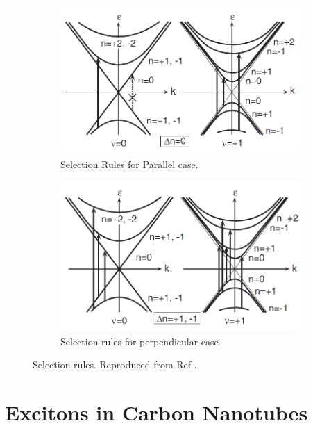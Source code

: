\begin{figure}[H]
	\centering
	\begin{subfigure}{\textwidth}
		\centering
		\includegraphics[scale=0.7]{images/chapter_optical_props/selection_rules_1.png}
		\caption{Selection Rules for Parallel case.}
	\end{subfigure}
	\begin{subfigure}{\textwidth}
		\centering
		\includegraphics[scale=0.7]{images/chapter_optical_props/selection_rules_2.png}
		\caption{Selection rules for perpendicular case}
	\end{subfigure}
	\caption{Selection rules. Reproduced from Ref \cite{ando2005theory}.}
	\label{fig:selection_rules}
\end{figure}

\section{Excitons in Carbon Nanotubes}

